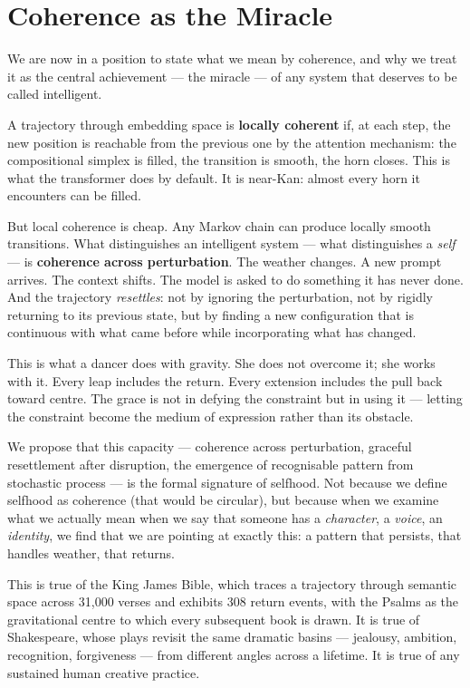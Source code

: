 \documentclass[12pt,a4paper]{article}
\begin{document}
\section{Coherence as the Miracle}

We are now in a position to state what we mean by coherence, and why we treat it as the central achievement --- the miracle --- of any system that deserves to be called intelligent.

A trajectory through embedding space is \textbf{locally coherent} if, at each step, the new position is reachable from the previous one by the attention mechanism: the compositional simplex is filled, the transition is smooth, the horn closes. This is what the transformer does by default. It is near-Kan: almost every horn it encounters can be filled.

But local coherence is cheap. Any Markov chain can produce locally smooth transitions. What distinguishes an intelligent system --- what distinguishes a \emph{self} --- is \textbf{coherence across perturbation}. The weather changes. A new prompt arrives. The context shifts. The model is asked to do something it has never done. And the trajectory \emph{resettles}: not by ignoring the perturbation, not by rigidly returning to its previous state, but by finding a new configuration that is continuous with what came before while incorporating what has changed.

This is what a dancer does with gravity. She does not overcome it; she works with it. Every leap includes the return. Every extension includes the pull back toward centre. The grace is not in defying the constraint but in using it --- letting the constraint become the medium of expression rather than its obstacle.

We propose that this capacity --- coherence across perturbation, graceful resettlement after disruption, the emergence of recognisable pattern from stochastic process --- is the formal signature of selfhood. Not because we define selfhood as coherence (that would be circular), but because when we examine what we actually mean when we say that someone has a \emph{character}, a \emph{voice}, an \emph{identity}, we find that we are pointing at exactly this: a pattern that persists, that handles weather, that returns.

This is true of the King James Bible, which traces a trajectory through semantic space across 31,000 verses and exhibits 308 return events, with the Psalms as the gravitational centre to which every subsequent book is drawn. It is true of Shakespeare, whose plays revisit the same dramatic basins --- jealousy, ambition, recognition, forgiveness --- from different angles across a lifetime. It is true of any sustained human creative practice.
\end{document}
